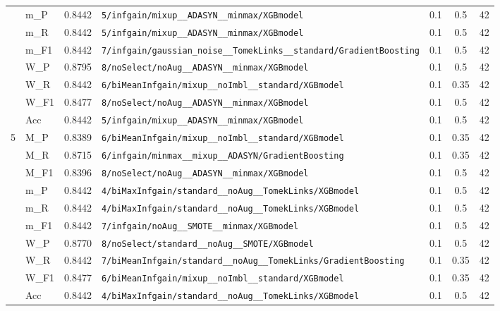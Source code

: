 \begin{table}[htbp]
\begin{tabular}{|c|l|c|>{\ttfamily\footnotesize}p{7.2cm}|c|c|c|}
 & m\_P & 0.8442 & \texttt{5/infgain/mixup\_\_ADASYN\_\_minmax/XGBmodel} & 0.1 & 0.5  & 42 \\ 
 & m\_R & 0.8442 & \texttt{5/infgain/mixup\_\_ADASYN\_\_minmax/XGBmodel} & 0.1 & 0.5  & 42 \\ 
 & m\_F1 & 0.8442 & \texttt{7/infgain/gaussian\_noise\_\_TomekLinks\_\_standard/GradientBoosting} & 0.1 & 0.5  & 42 \\ 
 & W\_P & 0.8795 & \texttt{8/noSelect/noAug\_\_ADASYN\_\_minmax/XGBmodel} & 0.1 & 0.5  & 42 \\ 
 & W\_R & 0.8442 & \texttt{6/biMeanInfgain/mixup\_\_noImbl\_\_standard/XGBmodel} & 0.1 & 0.35  & 42 \\ 
 & W\_F1 & 0.8477 & \texttt{8/noSelect/noAug\_\_ADASYN\_\_minmax/XGBmodel} & 0.1 & 0.5  & 42 \\ 
 & Acc & 0.8442 & \texttt{5/infgain/mixup\_\_ADASYN\_\_minmax/XGBmodel} & 0.1 & 0.5  & 42 \\ 
\hline
\multirow{10}{*}{5} & M\_P & 0.8389 & \texttt{6/biMeanInfgain/mixup\_\_noImbl\_\_standard/XGBmodel} & 0.1 & 0.35  & 42 \\ 
 & M\_R & 0.8715 & \texttt{6/infgain/minmax\_\_mixup\_\_ADASYN/GradientBoosting} & 0.1 & 0.35  & 42 \\ 
 & M\_F1 & 0.8396 & \texttt{8/noSelect/noAug\_\_ADASYN\_\_minmax/XGBmodel} & 0.1 & 0.5  & 42 \\ 
 & m\_P & 0.8442 & \texttt{4/biMaxInfgain/standard\_\_noAug\_\_TomekLinks/XGBmodel} & 0.1 & 0.5  & 42 \\ 
 & m\_R & 0.8442 & \texttt{4/biMaxInfgain/standard\_\_noAug\_\_TomekLinks/XGBmodel} & 0.1 & 0.5  & 42 \\ 
 & m\_F1 & 0.8442 & \texttt{7/infgain/noAug\_\_SMOTE\_\_minmax/XGBmodel} & 0.1 & 0.5  & 42 \\ 
 & W\_P & 0.8770 & \texttt{8/noSelect/standard\_\_noAug\_\_SMOTE/XGBmodel} & 0.1 & 0.5  & 42 \\ 
 & W\_R & 0.8442 & \texttt{7/biMeanInfgain/standard\_\_noAug\_\_TomekLinks/GradientBoosting} & 0.1 & 0.35  & 42 \\ 
 & W\_F1 & 0.8477 & \texttt{6/biMeanInfgain/mixup\_\_noImbl\_\_standard/XGBmodel} & 0.1 & 0.35  & 42 \\ 
 & Acc & 0.8442 & \texttt{4/biMaxInfgain/standard\_\_noAug\_\_TomekLinks/XGBmodel} & 0.1 & 0.5  & 42 \\ 
\hline
\end{tabular}
\end{table}